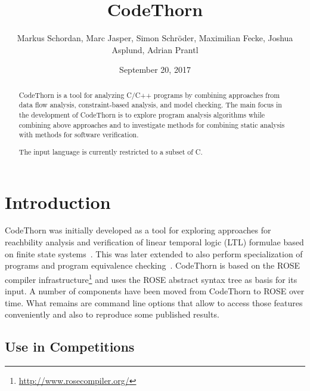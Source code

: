 \documentclass[natbib]{article}
\begin{document}
\title{CodeThorn}

\author{\small Markus Schordan, Marc Jasper, Simon Schr\"{o}der, Maximilian Fecke, Joshua Asplund, Adrian Prantl}
\date{September 20, 2017}

\maketitle

\begin{abstract}
\noindent CodeThorn is a tool for analyzing C/C++ programs by combining approaches
from data flow analysis, constraint-based analysis, and model
checking. The main focus in the development of CodeThorn is to explore program analysis algorithms while combining above
approaches and to investigate methods for combining static analysis with
methods for software verification.

The input language is currently restricted to a subset of C.

\end{abstract}

\tableofcontents


\section{Introduction}
\label{sec:intro}

CodeThorn was initially developed as a tool for exploring approaches
for reachbility analysis and verification of linear temporal logic (LTL)
formulae based on finite state systems~\cite{schordan2014combining}. 
This was later extended to
also perform specialization of programs and program equivalence
checking~\cite{schordan2014verification}. CodeThorn is based on the 
ROSE compiler infrastructure\footnote{\url{http://www.rosecompiler.org/}} 
and uses the ROSE abstract syntax tree as basis for its input. 
A number of components have been moved
from CodeThorn to ROSE over time. What remains are command line
options that allow to access those features conveniently and also to
reproduce some published results.

\nocite{roseWWW}

\subsection{Use in Competitions}
\end{document}
